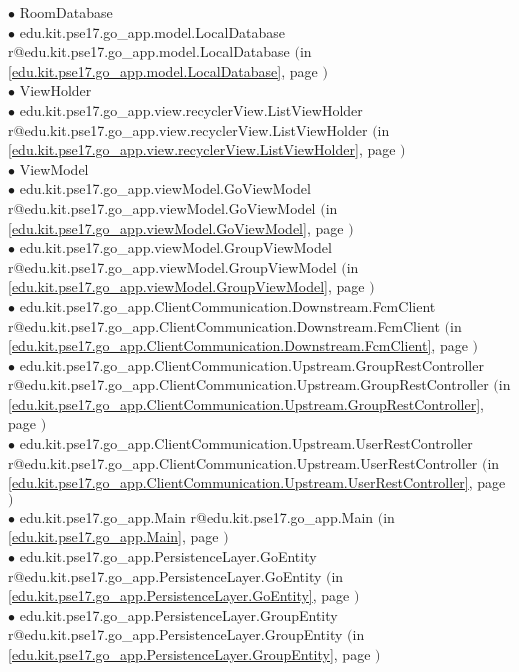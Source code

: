 \documentclass[11pt,a4paper]{report}
\makeatletter
\newcommand{\refdefined}[1]{
\expandafter\ifx\csname r@#1\endcsname\relax
\relax\else
{$($in \ref{#1}, page \pageref{#1}$)$}\fi}
\makeatother
\begin{document}
{{\hspace{1.0cm} $\bullet$ RoomDatabase {\tiny } \\
\hspace{2.0cm} $\bullet$ edu.kit.pse17.go\_app.model.LocalDatabase {\tiny \refdefined{edu.kit.pse17.go_app.model.LocalDatabase}} \\
\hspace{1.0cm} $\bullet$ ViewHolder {\tiny } \\
\hspace{2.0cm} $\bullet$ edu.kit.pse17.go\_app.view.recyclerView.ListViewHolder {\tiny \refdefined{edu.kit.pse17.go_app.view.recyclerView.ListViewHolder}} \\
\hspace{1.0cm} $\bullet$ ViewModel {\tiny } \\
\hspace{2.0cm} $\bullet$ edu.kit.pse17.go\_app.viewModel.GoViewModel {\tiny \refdefined{edu.kit.pse17.go_app.viewModel.GoViewModel}} \\
\hspace{2.0cm} $\bullet$ edu.kit.pse17.go\_app.viewModel.GroupViewModel {\tiny \refdefined{edu.kit.pse17.go_app.viewModel.GroupViewModel}} \\
\hspace{1.0cm} $\bullet$ edu.kit.pse17.go\_app.ClientCommunication.Downstream.FcmClient {\tiny \refdefined{edu.kit.pse17.go_app.ClientCommunication.Downstream.FcmClient}} \\
\hspace{1.0cm} $\bullet$ edu.kit.pse17.go\_app.ClientCommunication.Upstream.GroupRestController {\tiny \refdefined{edu.kit.pse17.go_app.ClientCommunication.Upstream.GroupRestController}} \\
\hspace{1.0cm} $\bullet$ edu.kit.pse17.go\_app.ClientCommunication.Upstream.UserRestController {\tiny \refdefined{edu.kit.pse17.go_app.ClientCommunication.Upstream.UserRestController}} \\
\hspace{1.0cm} $\bullet$ edu.kit.pse17.go\_app.Main {\tiny \refdefined{edu.kit.pse17.go_app.Main}} \\
\hspace{1.0cm} $\bullet$ edu.kit.pse17.go\_app.PersistenceLayer.GoEntity {\tiny \refdefined{edu.kit.pse17.go_app.PersistenceLayer.GoEntity}} \\
\hspace{1.0cm} $\bullet$ edu.kit.pse17.go\_app.PersistenceLayer.GroupEntity {\tiny \refdefined{edu.kit.pse17.go_app.PersistenceLayer.GroupEntity}} \\
}}
\end{document}
